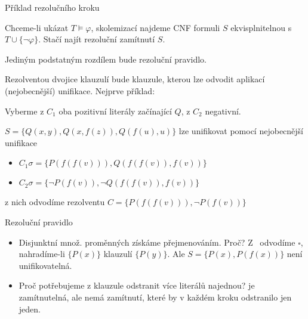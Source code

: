 \documentclass{beamer}
\begin{document}
\begin{frame}{Příklad rezolučního kroku}

    Chceme-li ukázat $T\models\varphi$, skolemizací najdeme CNF formuli $S$ ekvisplnitelnou s $T\cup\{\neg\varphi\}$. Stačí najít rezoluční zamítnutí $S$.

    Jediným podstatným rozdílem bude \alert{rezoluční pravidlo}. 

    Rezolventou dvojice klauzulí bude klauzule, kterou lze odvodit aplikací \alert{(nejobecnější) unifikace}. Nejprve příklad:


    Vyberme z $C_1$ \alert{oba} pozitivní literály začínající $Q$, z $C_2$ negativní. 

    $S=\{Q(x,y),Q(x,f(z)),Q(f(u),u)\}$ lze unifikovat pomocí nejobecnější unifikace 

    \begin{itemize}
        \item $C_1\sigma=\{P(f(f(v))),Q(f(f(v)),f(v))\}$
        \item $C_2\sigma=\{\neg P(f(v)),\neg Q(f(f(v)),f(v))\}$
    \end{itemize}

    z nich odvodíme rezolventu $C=\{P(f(f(v))),\neg P(f(v))\}$
    
\end{frame}


\begin{frame}{Rezoluční pravidlo}


    \medskip

    \begin{itemize}
        \item Disjunktní množ. proměnných získáme přejmenováním. Proč? Z~ odvodíme $\square$, nahradíme-li $\{P(x)\}$ klauzulí $\{P(y)\}$. Ale $S=\{P(x),P(f(x))\}$ není unifikovatelná.
    
        \item Proč potřebujeme z klauzule odstranit více literálů najednou?  je zamítnutelná, ale nemá zamítnutí, které by v každém kroku odstranilo jen jeden.  
    \end{itemize}
        
\end{frame}
\end{document}
